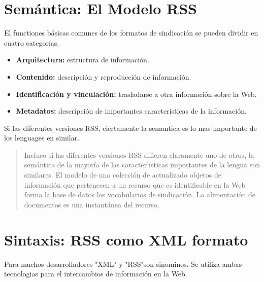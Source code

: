 \normalsize




\section{Sem\'{a}ntica: El Modelo RSS}

El functiones b\'{a}sicas comunes de los formatos de sindicaci\'{o}n se pueden dividir en cuatro categor\'{i}as.

\begin{itemize}

\item \textbf{Arquitectura:} estructura de informaci\'{o}n.

\item \textbf{Contenido:} descripci\'{o}n y reproducci\'{o}n de informaci\'{o}n.

\item \textbf{Identificaci\'{o}n y vinculaci\'{o}n:} trasladarse a otra informaci\'{o}n sobre la Web.

\item \textbf{Metadatos:} descripci\'{o}n de importantes caracteristicas de la informaci\'{o}n.

\end{itemize}

Si las diferentes versiones RSS, ciertamente la semantica es lo mas importante de los lenguages en similar.

\scriptsize

\begin{flushleft}

\blockquote{
Incluso si las diferentes versiones RSS difieren claramente uno de otros, la sem\'{a}ntica de la mayor\'{i}a
de las caracter'{i}sticas importantes de la lengua son similares. El modelo de una colecci\'{o}n de actualizado
objetos de informaci\'{o}n que pertenecen a un recurso que es identificable en la Web forma la base de datos los
vocabularios de sindicaci\'{o}n. La alimentaci\'{o}n de documentos es una instant\'{a}nea del recurso.\cite{wittenbrink2005rss}
}

\end{flushleft}

\normalsize

\section{Sintaxis: RSS como XML formato}

Para muchos desarrolladores "XML" y "RSS"son sinominos. Se utiliza ambas tecnologias para el intercambios de informaci\'{o}n
en la Web.

